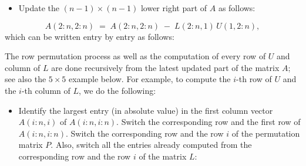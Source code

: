 \begin{itemize}
\item Update the $(n-1)\times(n-1)$ lower right part of $A$ as follows:
\end{itemize}
\begin{equation}
A(2:n,2:n) \;=\; A(2:n,2:n) \;-\; L(2:n,1)\,U(1,2:n),
\end{equation}
which can be written entry by entry as follows:

\begin{center}
\end{center}

The row permutation process as well as the computation of every row of $U$ and
column of $L$ are done recursively from the latest updated part of the matrix $A$;
see also the $5\times 5$ example below. For example, to compute the $i$-th row of
$U$ and the $i$-th column of $L$, we do the following:

\begin{itemize}
\item Identify the largest entry (in absolute value) in the first column vector
$A(i:n,i)$ of $A(i:n,i:n)$. Switch the corresponding row and the first row of
$A(i:n,i:n)$. Switch the corresponding row and the row $i$ of the permutation
matrix $P$. Also, switch all the entries already computed from the corresponding
row and the row $i$ of the matrix $L$:
\end{itemize}

\begin{center}
\end{center}

